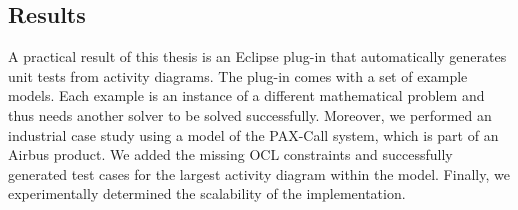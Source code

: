 \subsection{Results}
A practical result of this thesis is an Eclipse plug-in that automatically generates unit tests from activity diagrams. The plug-in comes with a set of example models. Each example is an instance of a different mathematical problem and thus needs another solver to be solved successfully. Moreover, we performed an industrial case study using a model of the PAX-Call system, which is part of an Airbus product. We added the missing OCL constraints and successfully generated test cases for the largest activity diagram within the model. Finally, we experimentally determined the scalability of the implementation.

